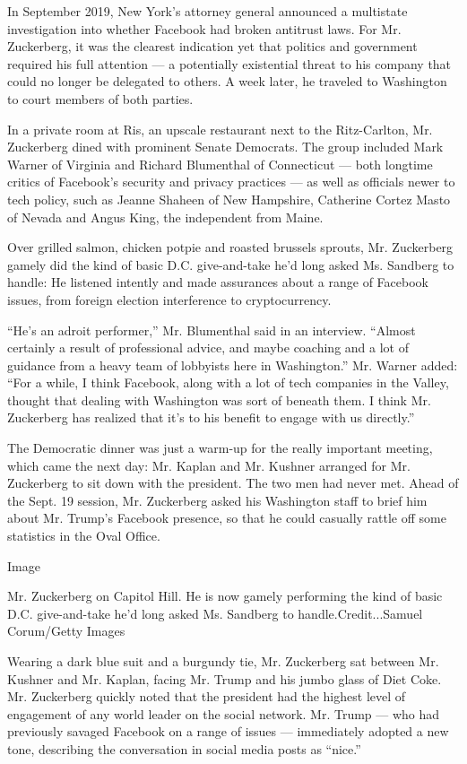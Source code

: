 In September 2019, New York's attorney general announced a multistate
investigation into whether Facebook had broken antitrust laws. For Mr.
Zuckerberg, it was the clearest indication yet that politics and
government required his full attention --- a potentially existential
threat to his company that could no longer be delegated to others. A
week later, he traveled to Washington to court members of both parties.

In a private room at Ris, an upscale restaurant next to the
Ritz-Carlton, Mr. Zuckerberg dined with prominent Senate Democrats. The
group included Mark Warner of Virginia and Richard Blumenthal of
Connecticut --- both longtime critics of Facebook's security and privacy
practices --- as well as officials newer to tech policy, such as Jeanne
Shaheen of New Hampshire, Catherine Cortez Masto of Nevada and Angus
King, the independent from Maine.

Over grilled salmon, chicken potpie and roasted brussels sprouts, Mr.
Zuckerberg gamely did the kind of basic D.C. give-and-take he'd long
asked Ms. Sandberg to handle: He listened intently and made assurances
about a range of Facebook issues, from foreign election interference to
cryptocurrency.

``He's an adroit performer,'' Mr. Blumenthal said in an interview.
``Almost certainly a result of professional advice, and maybe coaching
and a lot of guidance from a heavy team of lobbyists here in
Washington.'' Mr. Warner added: ``For a while, I think Facebook, along
with a lot of tech companies in the Valley, thought that dealing with
Washington was sort of beneath them. I think Mr. Zuckerberg has realized
that it's to his benefit to engage with us directly.''

The Democratic dinner was just a warm-up for the really important
meeting, which came the next day: Mr. Kaplan and Mr. Kushner arranged
for Mr. Zuckerberg to sit down with the president. The two men had never
met. Ahead of the Sept. 19 session, Mr. Zuckerberg asked his Washington
staff to brief him about Mr. Trump's Facebook presence, so that he could
casually rattle off some statistics in the Oval Office.

Image

Mr. Zuckerberg on Capitol Hill. He is now gamely performing the kind of
basic D.C. give-and-take he'd long asked Ms. Sandberg to
handle.Credit...Samuel Corum/Getty Images

Wearing a dark blue suit and a burgundy tie, Mr. Zuckerberg sat between
Mr. Kushner and Mr. Kaplan, facing Mr. Trump and his jumbo glass of Diet
Coke. Mr. Zuckerberg quickly noted that the president had the highest
level of engagement of any world leader on the social network. Mr. Trump
--- who had previously savaged Facebook on a range of issues ---
immediately adopted a new tone, describing the conversation in social
media posts as ``nice.''

